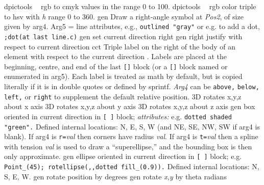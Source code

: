 %
  {dpictools}%
  {$\;\;$ rgb to cmyk values in the range 0 to 100.}%
%
  {dpictools}%
  {$\;\;$ rgb color triple to hsv with {\sl h} range 0 to 360.}%
%
  {gen}%
  {Draw a right-angle symbol at {\sl Pos2}, of size given by arg4.
   Arg5 = line attributes, e.g., {\tt outlined "gray"} or e.g. to add a dot,
    {\tt ;dot(at last line.c)}}%
%
  {gen}%
  {set current direction right }%
%
  {gen}%
  {right justify with respect to current direction}%
%
  {cct}%
  {Triple label on the right of the body of an element with respect to the
    current direction .  Labels are placed at the
    beginning, centre, and end of the last {\tt []} block (or a {\tt []} block
    named or enumerated in arg5). Each label is treated as math by
    default, but is copied literally if it is in double quotes or defined
    by sprintf.  {\sl Arg4} can be {\tt above,} {\tt below,} {\tt left,}
    or {\tt right} to supplement the default relative position.}%
%
  {3D} {rotates x,y,z about x axis}%
%
  {3D} {rotates x,y,z about y axis}%
%
  {3D} {rotates x,y,z about z axis}%
%
  {gen}%
  {box oriented in current direction in {\tt [ ]} block;
   {\sl attributes:} e.g. {\tt dotted shaded "green".}  Defined internal
   locations: N, E, S, W (and NE, SE, NW, SW if arg4 is blank).  If arg4
   is {\tt r=}{\sl val} then corners have radius {\sl val}.  If arg4 is
   {\tt t=}{\sl val} then a spline with tension {\sl val} is used to draw
   a ``superellipse,'' and the bounding box is then only approximate. }%
%
  {gen}%
  {ellipse oriented in current direction in {\tt [ ]} block;
   e.g. {\tt Point\_(45); rotellipse(,{},dotted fill\_(0.9)).} Defined
   internal locations: N, S, E, W.}%
%
  {gen}%
  {rotate position by degrees}%
%
  {gen}%
  {rotate {\sl x,y} by theta radians}%
%
